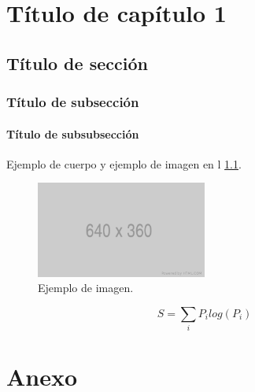 \documentclass[12pt,a4paper,oneside]{report}
\begin{document}
\cleardoublepage
{}
\tableofcontents \newpage
{}
\listoffigures \newpage
{}
\listoftables \newpage
\makegloss
\newpage
{}

\doublespacing
\chapter{Título de capítulo 1}
\section{Título de sección}
\subsection{Título de subsección}
\subsubsection{Título de subsubsección}
\begin{spacing}{1.5}
{Ejemplo de cuerpo y ejemplo de imagen en l \ref{fig:PLACEHOLDER}. }
\begin{figure}[H]
    \centering
    \includegraphics[width=0.5\textwidth]{imagenes/640x360.png}
    \caption{Ejemplo de imagen.}
    \label{fig:PLACEHOLDER}
\end{figure}

\begin{equation} \label{eq:1}
    S=\sum_iP_ilog(P_i)
\end{equation}


\end{spacing}




\appendix
\renewcommand{\appendixname}{Anexo}%
\chapter*{\appendixname}
\end{document}
